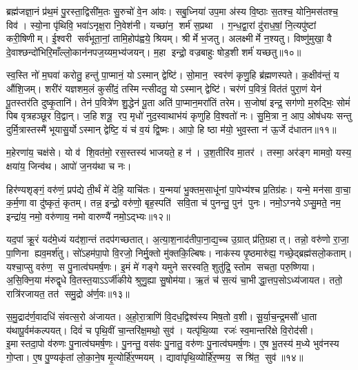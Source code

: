 ब्रह्म॑जज्ञा॒नं प्र॑थ॒मं पु॒रस्ता॒द्विसी॑म॒तः सु॒रुचो॑ वे॒न आ॑वः। सबु॒ध्निया॑ उप॒मा अ॑स्य वि॒ष्ठाः स॒तश्च॒ योनि॒मस॑तश्च॒ विव॑। स्यो॒ना पृ॑थिवि॒ भवा॑ऽनृक्ष॒रा नि॒वेश॑नी। यच्छा॑न॒ शर्म॑ स॒प्रथा। ग॒न्ध॒द्वा॒रां दु॑राध॒\ar{}षां॒ नि॒त्यपु॑ष्टां करी॒षिणीम्। ई॒श्वरी सर्व॑भूता॒नां॒ तामि॒होप॑ह्वये॒ श्रियम्। श्रीर्मे भ॒जतु। अलक्ष्मीर्मे न॒श्यतु। विष्णु॑मुखा॒ वै दे॒वाश्छन्दो॑भिरि॒माँल्लो॒कान॑नप\-ज॒य्यम॒भ्य॑जयन्। म॒हा इन्द्रो॒ वज्रबाहुः षोड॒शी शर्म॑ यच्छतु॥१०॥

 स्व॒स्ति नो॑ म॒घवा॑ करोतु॒ हन्तु॑ पा॒प्मानं॒ योऽस्मान् द्वेष्टि॑। सो॒मान॒ स्वर॑णं कृणु॒हि ब्र॑ह्मणस्पते। क॒क्षीव॑न्तं॒ य औ॑शि॒जम्। शरी॑रं यज्ञशम॒लं कुसी॑दं॒ तस्मिन्त्सीदतु॒ योऽस्मान् द्वेष्टि॑। चर॑णं प॒वित्रं॒ वित॑तं पुरा॒णं येन॑ पू॒तस्तर॑ति दुष्कृ॒तानि॑। तेन॑ प॒वित्रे॑ण शु॒द्धेन॑ पू॒ता अति॑ पा॒प्मान॒मरा॑तिं तरेम। स॒जोषा॑ इन्द्र॒ सग॑णो म॒रुद्भिः॒ सोमं॑ पिब वृत्रहञ्छूर वि॒द्वान्। ज॒हि शत्रू॒ रप॒ मृधो॑ नुद॒स्वाथाभ॑यं कृणुहि वि॒श्वतो॑ नः। सु॒मि॒त्रा न॒ आप॒ ओष॑धयः सन्तु दुर्मि॒त्रास्तस्मै॑ भूयासु॒र्योऽस्मान् द्वेष्टि॒ यं च॑ व॒यं द्वि॒ष्मः। आपो॒ हि ष्ठा म॑यो॒ भुव॒स्ता न॑ ऊ॒र्जे द॑धातन॥११॥
 
 म॒हेरणा॑य॒ चक्ष॑से। यो व॑ शि॒वत॑मो॒ रस॒स्तस्य॑ भाजयते॒ ह न॑। उ॒श॒तीरि॑व मा॒तर॑। तस्मा॒ अर॑ङ्ग मामवो॒ यस्य॒ क्षया॑य॒ जिन्व॑थ। आपो॑ ज॒नय॑था च नः।

 
हिर॑ण्यशृङ्गं॒ वरु॑णं॒ प्रप॑द्ये ती॒र्थं मे॑ देहि॒ याचि॑तः। य॒न्मया॑ भु॒क्तम॒साधू॑नां पा॒पेभ्य॑श्च प्र॒तिग्र॑हः। यन्मे॒ मन॑सा वा॒चा॒ क॒र्म॒णा वा दु॑ष्कृतं॒ कृतम्। तन्न॒ इन्द्रो॒ वरु॑णो॒ बृह॒स्पति॑ सवि॒ता च॑ पुनन्तु॒ पुन॑ पुनः। नमो॒ऽग्नयेऽप्सु॒मते॒ नम॒ इन्द्रा॑य॒ नमो॒ वरु॑णाय॒ नमो वारुण्यै॑ नमो॒ऽद्भ्यः॥१२॥

 यद॒पां क्रू॒रं यद॑मे॒ध्यं यद॑शा॒न्तं तदप॑गच्छतात्। अ॒त्या॒श॒नाद॑ती\-पा॒ना॒द्य॒च्च उ॒ग्रात् प्र॑ति॒ग्रहात्। तन्नो॒ वरु॑णो रा॒जा॒ पा॒णिना ह्यव॒मर्\mbox{}श॑तु। सो॑ऽहम॑पा॒पो वि॒रजो॒ निर्मु॒क्तो मु॑क्तकि॒ल्बिषः। नाक॑स्य पृ॒ष्ठमारु॑ह्य॒ गच्छे॒द्ब्रह्म॑सलो॒कताम्। यश्चा॒प्सु वरु॑ण॒ स पु॒नात्व॑घमर्\mbox{}ष॒णः। इ॒मं मे॑ गङ्गे यमुने सरस्वति॒ शुतु॑द्रि॒ स्तोम सचता॒ परु॒ष्णिया। अ॒सि॒क्नि॒या म॑रुद्\mbox{}वृधे वि॒तस्त॒याऽऽर्जी॑कीये श्रुणु॒ह्या सु॒षोम॑या। ऋ॒तं च॑ स॒त्यं चा॒भीद्धा॒त्तप॒सोऽध्य॑जायत। ततो॒ रात्रि॑रजायत॒ तत॑ समु॒द्रो अ॑र्ण॒वः॥१३॥
 
 स॒मु॒द्राद॑र्ण॒वादधि॑ संवत्स॒रो अ॑जायत। अ॒हो॒रा॒त्राणि॑ वि॒दध॒द्विश्व॑स्य मिष॒तो व॒शी। सू॒र्या॒च॒न्द्र॒मसौ॑ धा॒ता य॑थापू॒र्वम॑कल्पयत्। दिवं॑ च पृथि॒वीं चा॒न्तरि॑क्ष॒मथो॒ सुव॑। यत्पृ॑थि॒व्या रजः॑ स्व॒मान्तरि॑क्षे वि॒रोद॑सी। इ॒मास्तदा॒पो व॑रुणः पु॒नात्व॑घमर्\mbox{}ष॒णः। पु॒नन्तु॒ वस॑वः पु॒नातु॒ वरु॑णः पु॒नात्व॑घमर्\mbox{}ष॒णः। ए॒ष भू॒तस्य॑ म॒ध्ये भुव॑नस्य गो॒प्ता। ए॒ष पु॒ण्यकृ॑तां लो॒का॒ने॒ष मृ॒त्योर्\mbox{}हि॑र॒ण्मयम्। द्यावा॑पृथि॒व्योर्\mbox{}हि॑र॒ण्मय॒ सश्रि॑त॒ सुव॑॥१४॥

